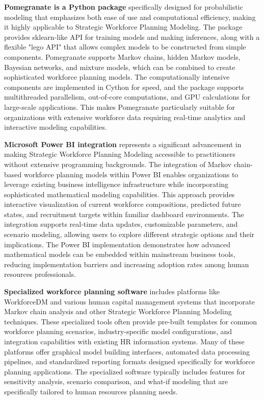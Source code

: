 \documentclass[main.tex]{subfiles}
\begin{document}
\textbf{Pomegranate is a Python package} specifically designed for probabilistic modeling that emphasizes both ease of use and computational efficiency, making it highly applicable to Strategic Workforce Planning Modeling\parencite{schreiber2019}. The package provides sklearn-like API for training models and making inferences, along with a flexible "lego API" that allows complex models to be constructed from simple components. Pomegranate supports Markov chains, hidden Markov models, Bayesian networks, and mixture models, which can be combined to create sophisticated workforce planning models. The computationally intensive components are implemented in Cython for speed, and the package supports multithreaded parallelism, out-of-core computations, and GPU calculations for large-scale applications. This makes Pomegranate particularly suitable for organizations with extensive workforce data requiring real-time analytics and interactive modeling capabilities.

\textbf{Microsoft Power BI integration} represents a significant advancement in making Strategic Workforce Planning Modeling accessible to practitioners without extensive programming backgrounds\parencite{coursehero2024}. The integration of Markov chain-based workforce planning models within Power BI enables organizations to leverage existing business intelligence infrastructure while incorporating sophisticated mathematical modeling capabilities. This approach provides interactive visualization of current workforce compositions, predicted future states, and recruitment targets within familiar dashboard environments. The integration supports real-time data updates, customizable parameters, and scenario modeling, allowing users to explore different strategic options and their implications. The Power BI implementation demonstrates how advanced mathematical models can be embedded within mainstream business tools, reducing implementation barriers and increasing adoption rates among human resources professionals.

\textbf{Specialized workforce planning software} includes platforms like WorkforceDM and various human capital management systems that incorporate Markov chain analysis and other Strategic Workforce Planning Modeling techniques\parencite{workforcedm2024}. These specialized tools often provide pre-built templates for common workforce planning scenarios, industry-specific model configurations, and integration capabilities with existing HR information systems. Many of these platforms offer graphical model building interfaces, automated data processing pipelines, and standardized reporting formats designed specifically for workforce planning applications. The specialized software typically includes features for sensitivity analysis, scenario comparison, and what-if modeling that are specifically tailored to human resources planning needs.
\end{document}
